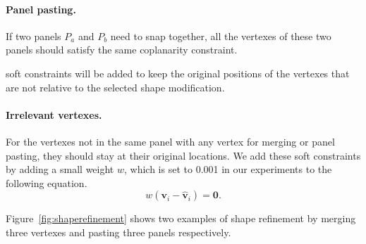 {\paragraph{Panel pasting.}
If two panels $P_a$ and $P_b$ need to snap together, all the vertexes of these two panels should satisfy the same coplanarity constraint. 



 soft constraints will be added to keep the original positions of the vertexes that are not relative to the selected shape modification.

\paragraph{Irrelevant vertexes.} For the vertexes not in the same panel with any vertex for merging or panel pasting, they should stay at their original locations. 
We add these soft constraints by adding a small weight $w$, which is set to 0.001 in our experiments to the following equation. 
\begin{equation}
w(\mathbf{v}_i - \mathbf{\hat{v}}_i) = \mathbf{0}.
\label{equ:irrelevant}
\end{equation}

Figure~\ref{fig:shaperefinement} shows two examples of shape refinement by merging three vertexes and pasting three panels respectively. 

}
